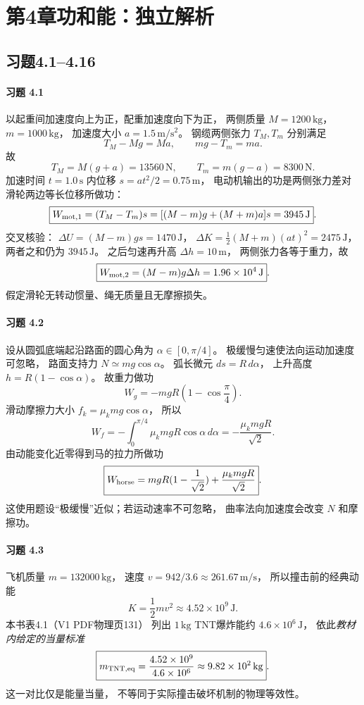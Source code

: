 \section*{第4章\quad 功和能：独立解析}
\subsection*{习题4.1--4.16}

\paragraph{习题 4.1}
以起重间加速度向上为正，配重加速度向下为正，
两侧质量 \(M=1200\,\mathrm{kg}\)，
\(m=1000\,\mathrm{kg}\)，
加速度大小 \(a=1.5\,\mathrm{m/s^2}\)。
钢缆两侧张力 \(T_M,T_m\) 分别满足
\[
 T_M-Mg=Ma,\qquad mg-T_m=ma.
\]
故
\[
 \boxed{T_M=M(g+a)=13560\,\mathrm N},\qquad
 \boxed{T_m=m(g-a)=8300\,\mathrm N}.
\]
加速时间 \(t=1.0\,\mathrm s\) 内位移
\(s=at^2/2=0.75\,\mathrm m\)，
电动机输出的功是两侧张力差对滑轮两边等长位移所做功：
\[
 \boxed{W_{\rm mot,1}=(T_M-T_m)s
 =[ (M-m)g+(M+m)a]s
 =3945\,\mathrm J}.
\]
交叉核验：
\(\Delta U=(M-m)gs=1470\,\mathrm J\)，
\(\Delta K=\frac12(M+m)(at)^2=2475\,\mathrm J\)，
两者之和仍为 \(3945\,\mathrm J\)。
之后匀速再升高 \(\Delta h=10\,\mathrm m\)，
两侧张力各等于重力，故
\[
 \boxed{W_{\rm mot,2}=(M-m)g\Delta h
 =1.96\times10^4\,\mathrm J}.
\]
假定滑轮无转动惯量、绳无质量且无摩擦损失。

\paragraph{习题 4.2}
设从圆弧底端起沿路面的圆心角为
\(\alpha\in[0,\pi/4]\)。
极缓慢匀速使法向运动加速度可忽略，
路面支持力 \(N\simeq mg\cos\alpha\)。
弧长微元 \(ds=R\,d\alpha\)，
上升高度 \(h=R(1-\cos\alpha)\)。
故重力做功
\[
 \boxed{W_g=-mgR(1-\cos\frac\pi4)}.
\]
滑动摩擦力大小 \(f_k=\mu_kmg\cos\alpha\)，
所以
\[
 \boxed{W_f=-\int_0^{\pi/4}\mu_kmgR\cos\alpha\,d\alpha
 =-\frac{\mu_kmgR}{\sqrt2}}.
\]
由动能变化近零得到马的拉力所做功
\[
 \boxed{W_{\rm horse}=mgR(1-\frac1{\sqrt2})
 +\frac{\mu_kmgR}{\sqrt2}}.
\]
这使用题设“极缓慢”近似；若运动速率不可忽略，
曲率法向加速度会改变 \(N\) 和摩擦功。

\paragraph{习题 4.3}
飞机质量 \(m=132000\,\mathrm{kg}\)，
速度 \(v=942/3.6\approx261.67\,\mathrm{m/s}\)，
所以撞击前的经典动能
\[
 \boxed{K=\frac12mv^2
 \approx4.52\times10^9\,\mathrm J}.
\]
本书表4.1（V1 PDF物理页131）
列出 \(1\,\mathrm{kg}\) TNT爆炸能约
\(4.6\times10^6\,\mathrm J\)，
依此\emph{教材内给定的当量标准}
\[
 \boxed{m_{\rm TNT,eq}
 =\frac{4.52\times10^9}{4.6\times10^6}
 \approx9.82\times10^2\,\mathrm{kg}}.
\]
这一对比仅是能量当量，
不等同于实际撞击破坏机制的物理等效性。

